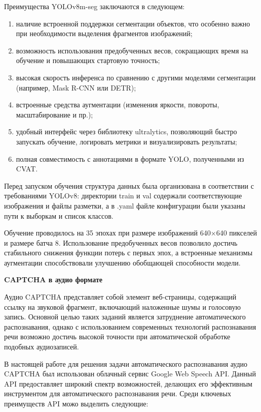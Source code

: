 Преимущества YOLOv8m-seg заключаются в следующем:
\begin{enumerate}
    \item наличие встроенной поддержки сегментации объектов, что особенно важно 
    при необходимости выделения фрагментов изображений;
    \item возможность использования предобученных весов, сокращающих время на 
    обучение и повышающих стартовую точность;
    \item высокая скорость инференса по сравнению с другими моделями сегментации 
    (например, Mask R-CNN или DETR);
    \item встроенные средства аугментации (изменения яркости, повороты, 
    масштабирование и пр.);
    \item удобный интерфейс через библиотеку ultralytics, позволяющий быстро 
    запускать обучение, логировать метрики и визуализировать результаты;
    \item полная совместимость с аннотациями в формате YOLO, полученными из CVAT.
\end{enumerate}

Перед запуском обучения структура данных была организована в соответствии с 
требованиями YOLOv8: директории train и val содержали соответствующие изображения 
и файлы разметки, а в .yaml файле конфигурации были указаны пути к выборкам и 
список классов.

Обучение проводилось на 35 эпохах при размере изображений 640×640 пикселей и 
размере батча 8. Использование предобученных весов позволило достичь стабильного 
снижения функции потерь с первых эпох, а встроенные механизмы аугментации 
способствовали улучшению обобщающей способности модели.

\textbf{CAPTCHA в аудио формате}

Аудио CAPTCHA представляет собой элемент веб-страницы, содержащий ссылку на 
звуковой фрагмент, включающий наложенные шумы и голосовую запись. Основной целью 
таких заданий является затруднение автоматического распознавания, однако с 
использованием современных технологий распознавания речи возможно достичь высокой 
точности при автоматической обработке подобных аудиозаписей.

В настоящей работе для решения задачи автоматического распознавания аудио CAPTCHA 
был использован облачный сервис Google Web Speech API. Данный API предоставляет 
широкий спектр возможностей, делающих его эффективным инструментом для 
автоматического распознавания речи. Среди ключевых преимуществ API можо выделить 
следующие:

